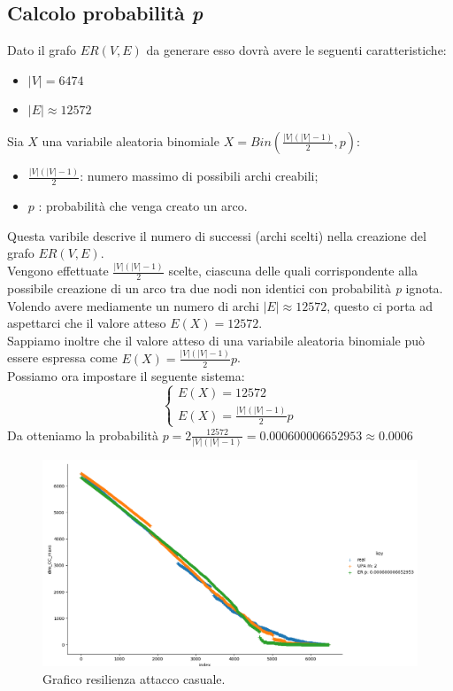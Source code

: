\documentclass{article}
\begin{document}
\subsection*{Calcolo probabilità \textit{p}}
Dato il grafo $ER(V,E)$ da generare esso dovrà avere le seguenti caratteristiche:
\begin{itemize}
	\item $|V|= 6474$
	\item $|E| \approx 12572$
\end{itemize}
Sia $X$ una variabile aleatoria binomiale $X=Bin(\frac{|V|(|V|-1)}{2},p)$:
\begin{itemize}
	\item $\frac{|V|(|V|-1)}{2}$: numero massimo di possibili archi creabili;
	\item $p$ : probabilità che venga creato un arco.
\end{itemize} 
Questa varibile descrive il numero di successi (archi scelti) nella creazione del grafo $ER(V,E)$.\\
Vengono effettuate $\frac{|V|(|V|-1)}{2}$ scelte, ciascuna delle quali corrispondente alla possibile creazione di un arco tra due nodi non identici con probabilità \textit{p} ignota.\\
Volendo avere mediamente un numero di archi $|E| \approx 12572$, questo ci porta ad aspettarci che il valore atteso $E(X) = 12572$.\\
Sappiamo inoltre che il valore atteso di una variabile aleatoria binomiale può essere espressa come  $E(X)=\frac{|V|(|V|-1)}{2}p$.\\
Possiamo ora impostare il seguente sistema:
$$
\begin{cases}
	E(X) = 12572               \\ 
	E(X)=\frac{|V|(|V|-1)}{2}p 
\end{cases}
$$
Da otteniamo la probabilità $p = 2\frac{12572}{|V|(|V|-1)} = 0.000600006652953 \approx 0.0006$
\begin{landscape}
	\begin{figure}
		\centering
		\includegraphics[width=1.8\textwidth]{../grafici/Figure_4}
		\caption{Grafico resilienza attacco casuale.}
	\end{figure}
\end{landscape}
\end{document}
